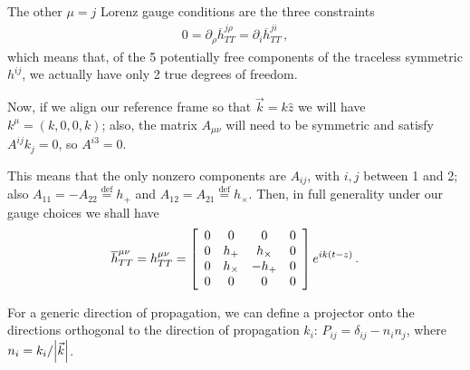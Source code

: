 \documentclass[main.tex]{subfiles}
\begin{document}
The other \(\mu = j\) Lorenz gauge conditions are the three constraints
%
\begin{align}
0= \partial_{\rho } \overline{h}^{j \rho }_{TT} = \partial_{i} \overline{h}^{ji}_{TT}
\,,
\end{align}
%
which means that, of the 5 potentially free components of the traceless symmetric \(h^{ij}\), we actually have only 2 true degrees of freedom.

Now, if we align our reference frame so that \(\vec{k} = k \hat{z}\) we will have \(k^{\mu } = (k, 0, 0, k)\); also, the matrix \(A_{\mu \nu }\) will need to be symmetric and satisfy \(A^{ij}k_{j} = 0\), so \(A^{i3}=0\).

This means that the only nonzero components are \(A_{ij}\), with \(i, j\) between 1 and 2; also \(A_{11} = - A_{22} \overset{\text{def}}{=} h_+\) and \(A_{12} = A_{21} \overset{\text{def}}{=} h_{ \times }\).
Then, in full generality under our gauge choices we shall have 
%
\begin{subequations}
\begin{align}
\overline{h}^{\mu \nu }_{TT} =
h^{\mu \nu }_{TT} = 
\left[\begin{array}{cccc}
0 & 0 & 0 & 0 \\ 
0 & h_{+} & h_{ \times } & 0 \\ 
0 & h_{ \times } & - h_{+} & 0 \\ 
0 & 0 & 0 & 0
\end{array}\right]
e^{i k \qty(t -z)}
\,.
\end{align}
\end{subequations}

\begin{claim}
For a generic direction of propagation, we can define a projector onto the directions orthogonal to the direction of propagation \(k_{i}\): \(P_{ij} = \delta_{ij} - n_i n_j\), where \(n_i = k_i / \abs{\vec{k}}\).
\end{claim}
\end{document}
